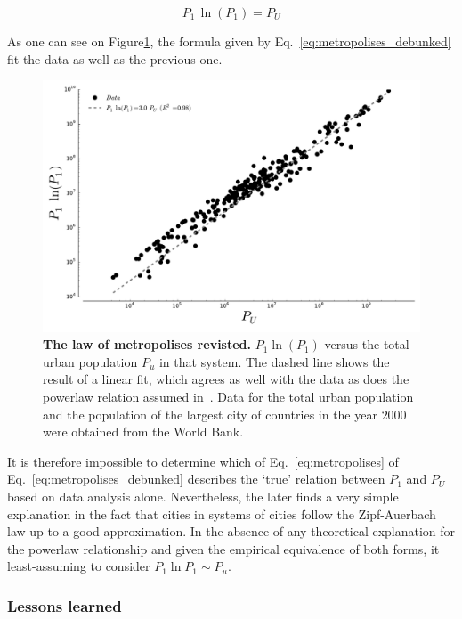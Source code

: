 \begin{equation}
    \boxed{P_1\,\ln(P_1) = P_U}
    \label{eq:metropolises_debunked}
\end{equation}

As one can see on Figure\ref{fig:metropolises_debunked}, the formula given by
Eq.~\ref{eq:metropolises_debunked} fit the data as well as the previous one.

\begin{figure}[!h]
    \centering
    \includegraphics[width=\textwidth]{gfx/chapter-intro/law_metropolises_debunked.pdf}
    \caption{{\bf The law of metropolises revisted.} $P_1 \ln(P_1)$ versus the total urban population $P_u$ in that
system. The dashed line shows the result of a linear fit, which agrees as well
with the data as does the powerlaw relation assumed in~\cite{Pumain:1997}. Data for the total urban
population and the population of the largest city of countries in the year
$2000$ were obtained from
the World Bank.\label{fig:metropolises_debunked}}
\end{figure}


It is therefore impossible to determine which of
Eq.~\ref{eq:metropolises} of Eq.~\ref{eq:metropolises_debunked} describes the
`true' relation between $P_1$ and $P_U$ based on data analysis alone.
Nevertheless, the later finds a very simple explanation in the fact that cities
in systems of cities follow the Zipf-Auerbach law up to a good
approximation. In the absence of any theoretical explanation for the powerlaw
relationship and given the empirical equivalence of both forms, it
least-assuming to consider $P_1 \ln P_1 \sim P_u$.


\subsubsection{Lessons learned}
\label{sub:lessons_learned}

